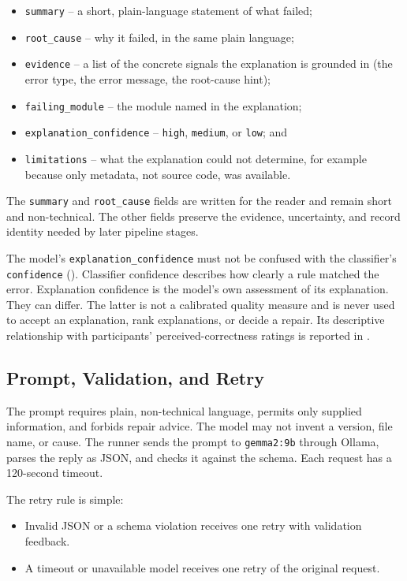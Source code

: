 \begin{itemize}
  \item \texttt{summary} -- a short, plain-language statement of what failed;
  \item \texttt{root\_cause} -- why it failed, in the same plain language;
  \item \texttt{evidence} -- a list of the concrete signals the explanation
        is grounded in (the error type, the error message, the root-cause
        hint);
  \item \texttt{failing\_module} -- the module named in the explanation;
  \item \texttt{explanation\_confidence} -- \texttt{high}, \texttt{medium},
        or \texttt{low}; and
  \item \texttt{limitations} -- what the explanation could not determine,
        for example because only metadata, not source code, was available.
\end{itemize}

The \texttt{summary} and \texttt{root\_cause} fields are written for the
reader and remain short and non-technical. The other fields preserve the
evidence, uncertainty, and record identity needed by later pipeline stages.

The model's \texttt{explanation\_confidence} must not be confused with the
classifier's \texttt{confidence} (). Classifier
confidence describes how clearly a rule matched the error. Explanation
confidence is the model's own assessment of its explanation. They can differ.
The latter is not a calibrated quality measure and is never used to accept an
explanation, rank explanations, or decide a repair. Its descriptive
relationship with participants' perceived-correctness ratings is reported in
.

\subsection{Prompt, Validation, and Retry}

The prompt requires plain, non-technical language, permits only supplied
information, and forbids repair advice. The model may not invent a version,
file name, or cause. The runner sends the prompt to \texttt{gemma2:9b} through
Ollama, parses the reply as JSON, and checks it against the schema. Each
request has a 120-second timeout.

The retry rule is simple:

\begin{itemize}
  \item Invalid JSON or a schema violation receives one retry with validation
        feedback.
  \item A timeout or unavailable model receives one retry of the original
        request.
\end{itemize}


